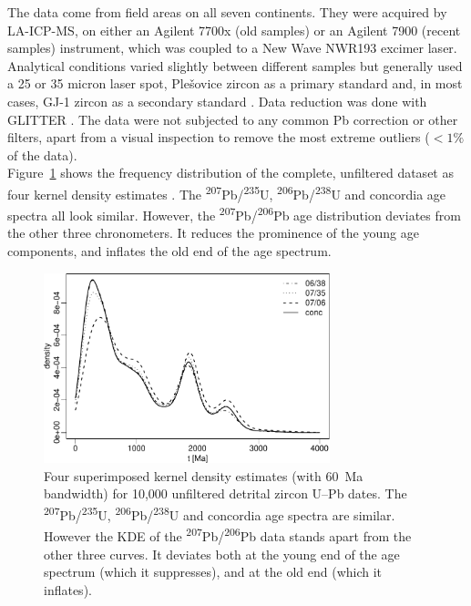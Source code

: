 \documentclass[gchron, manuscript]{copernicus}
\begin{document}
The data come from field areas on all seven continents. They were
acquired by LA-ICP-MS, on either an Agilent 7700x (old samples) or an
Agilent 7900 (recent samples) instrument, which was coupled to a New
Wave NWR193 excimer laser. Analytical conditions varied slightly
between different samples but generally used a 25 or 35 micron laser
spot, Ple\v{s}ovice zircon as a primary standard \citep{slama2008}
and, in most cases, GJ-1 zircon as a secondary standard
\citep{jackson2004}. Data reduction was done with GLITTER
\citep{griffin2008}. The data were not subjected to any common Pb
correction or other filters, apart from a visual inspection to remove
the most extreme outliers ($<1\%$ of the data).\\

Figure~\ref{fig:KDE} shows the frequency distribution of the complete,
unfiltered dataset as four kernel density estimates
\citep{vermeesch2012b}. The
\textsuperscript{207}Pb/\textsuperscript{235}U,
\textsuperscript{206}Pb/\textsuperscript{238}U and concordia age
spectra all look similar. However, the
\textsuperscript{207}Pb/\textsuperscript{206}Pb age distribution
deviates from the other three chronometers. It reduces the prominence
of the young age components, and inflates the old end of the age
spectrum.\\

\begin{figure}
  \includegraphics[width=8.3cm]{KDE.pdf}
  \caption{Four superimposed kernel density estimates (with 60~Ma
    bandwidth) for 10,000 unfiltered detrital zircon U--Pb
    dates. The \textsuperscript{207}Pb/\textsuperscript{235}U,
    \textsuperscript{206}Pb/\textsuperscript{238}U and concordia age
    spectra are similar.  However the KDE of the
    \textsuperscript{207}Pb/\textsuperscript{206}Pb data stands
    apart from the other three curves. It deviates both at the young
    end of the age spectrum (which it suppresses), and at the old
    end (which it inflates).
  }
  \label{fig:KDE}
\end{figure}
\end{document}
